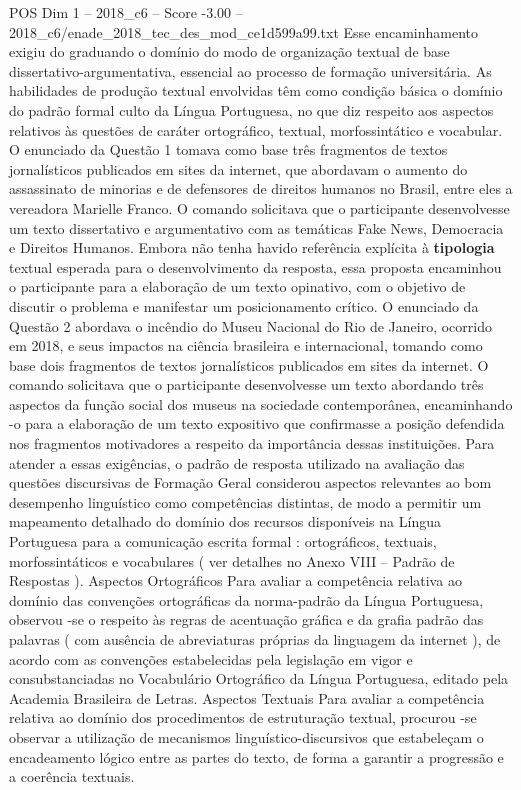 \begin{textsample}{POS Dim 1 – 2018\_c6 – Score -3.00 – 2018\_c6/enade\_2018\_tec\_des\_mod\_ce1d599a99.txt}
Esse encaminhamento exigiu do graduando o domínio do modo de organização textual de base dissertativo-argumentativa, essencial ao processo de formação universitária.
As habilidades de produção textual envolvidas têm como condição básica o domínio do padrão formal culto da Língua Portuguesa, no que diz respeito aos aspectos relativos às questões de caráter ortográfico, textual, morfossintático e vocabular.
O enunciado da Questão 1 tomava como base três fragmentos de textos jornalísticos publicados em sites da internet, que abordavam o aumento do assassinato de minorias e de defensores de direitos humanos no Brasil, entre eles a vereadora Marielle Franco.
O comando solicitava que o participante desenvolvesse um texto dissertativo e argumentativo com as temáticas Fake News, Democracia e Direitos Humanos.
Embora não tenha havido referência explícita à \textbf{tipologia} textual esperada para o desenvolvimento da resposta, essa proposta encaminhou o participante para a elaboração de um texto opinativo, com o objetivo de discutir o problema e manifestar um posicionamento crítico.
O enunciado da Questão 2 abordava o incêndio do Museu Nacional do Rio de Janeiro, ocorrido em 2018, e seus impactos na ciência brasileira e internacional, tomando como base dois fragmentos de textos jornalísticos publicados em sites da internet.
O comando solicitava que o participante desenvolvesse um texto abordando três aspectos da função social dos museus na sociedade contemporânea, encaminhando -o para a elaboração de um texto expositivo que confirmasse a posição defendida nos fragmentos motivadores a respeito da importância dessas instituições.
Para atender a essas exigências, o padrão de resposta utilizado na avaliação das questões discursivas de Formação Geral considerou aspectos relevantes ao bom desempenho linguístico como competências distintas, de modo a permitir um mapeamento detalhado do domínio dos recursos disponíveis na Língua Portuguesa para a comunicação escrita formal : ortográficos, textuais, morfossintáticos e vocabulares ( ver detalhes no Anexo VIII – Padrão de Respostas ).
Aspectos Ortográficos Para avaliar a competência relativa ao domínio das convenções ortográficas da norma-padrão da Língua Portuguesa, observou -se o respeito às regras de acentuação gráfica e da grafia padrão das palavras ( com ausência de abreviaturas próprias da linguagem da internet ), de acordo com as convenções estabelecidas pela legislação em vigor e consubstanciadas no Vocabulário Ortográfico da Língua Portuguesa, editado pela Academia Brasileira de Letras.
Aspectos Textuais Para avaliar a competência relativa ao domínio dos procedimentos de estruturação textual, procurou -se observar a utilização de mecanismos linguístico-discursivos que estabeleçam o encadeamento lógico entre as partes do texto, de forma a garantir a progressão e a coerência textuais.

\end{textsample}
